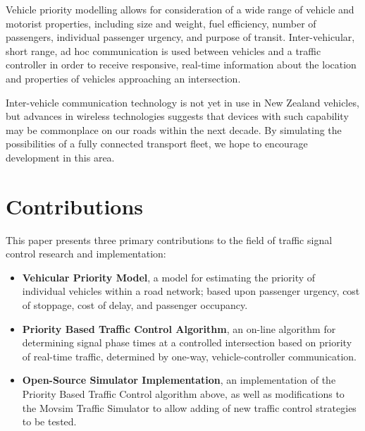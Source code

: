 Vehicle priority modelling allows for consideration of a wide range of vehicle and motorist properties, including size and weight, fuel efficiency, number of passengers, individual passenger urgency, and purpose of transit. Inter-vehicular, short range, ad hoc communication is used between vehicles and a traffic controller in order to receive responsive, real-time information about the location and properties of vehicles approaching an intersection. 

Inter-vehicle communication technology is not yet in use in New Zealand vehicles, but advances in wireless technologies suggests that devices with such capability may be commonplace on our roads within the next decade. By simulating the possibilities of a fully connected transport fleet, we hope to encourage development in this area.

\section{Contributions}

This paper presents three primary contributions to the field of traffic signal control research and implementation:

\begin{itemize}
\item \textbf{Vehicular Priority Model}, a model for estimating the priority of individual vehicles within a road network; based upon passenger urgency, cost of stoppage, cost of delay, and passenger occupancy.
\item \textbf{Priority Based Traffic Control Algorithm}, an on-line algorithm for determining signal phase times at a controlled intersection based on priority of real-time traffic, determined by one-way, vehicle-controller communication. 
\item \textbf{Open-Source Simulator Implementation}, an implementation of the Priority Based Traffic Control algorithm above, as well as modifications to the Movsim Traffic Simulator to allow adding of new traffic control strategies to be tested.
\end{itemize}





